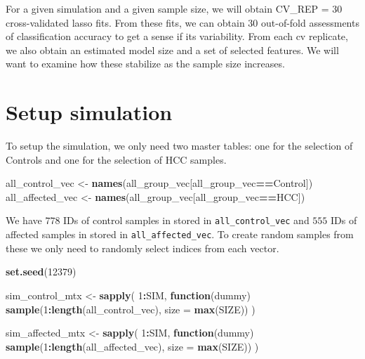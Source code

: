 \documentclass[
]{book}
\newenvironment{Shaded}{\begin{snugshade}}{\end{snugshade}}
\newcommand{\ControlFlowTok}[1]{\textcolor[rgb]{0.13,0.29,0.53}{\textbf{#1}}}
\newcommand{\DataTypeTok}[1]{\textcolor[rgb]{0.13,0.29,0.53}{#1}}
\newcommand{\DecValTok}[1]{\textcolor[rgb]{0.00,0.00,0.81}{#1}}
\newcommand{\KeywordTok}[1]{\textcolor[rgb]{0.13,0.29,0.53}{\textbf{#1}}}
\newcommand{\NormalTok}[1]{#1}
\newcommand{\OperatorTok}[1]{\textcolor[rgb]{0.81,0.36,0.00}{\textbf{#1}}}
\newcommand{\StringTok}[1]{\textcolor[rgb]{0.31,0.60,0.02}{#1}}
\begin{document}
For a given simulation and a given sample size, we will obtain
CV\_REP = \(30\) cross-validated lasso fits. From these fits,
we can obtain \(30\) out-of-fold assessments of classification accuracy
to get a sense if its variability. From each cv replicate, we also obtain
an estimated model size and a set of selected features. We will want
to examine how these stabilize as the sample size increases.

\hypertarget{setup-simulation}{%
\section{Setup simulation}\label{setup-simulation}}

To setup the simulation, we only need two master tables: one for the selection of Controls
and one for the selection of HCC samples.

\begin{Shaded}
\begin{Highlighting}[]
\NormalTok{all\_control\_vec <{-}}\StringTok{ }\KeywordTok{names}\NormalTok{(all\_group\_vec[all\_group\_vec}\OperatorTok{==}\StringTok{\textquotesingle{}Control\textquotesingle{}}\NormalTok{]) }
\NormalTok{all\_affected\_vec <{-}}\StringTok{ }\KeywordTok{names}\NormalTok{(all\_group\_vec[all\_group\_vec}\OperatorTok{==}\StringTok{\textquotesingle{}HCC\textquotesingle{}}\NormalTok{])  }
\end{Highlighting}
\end{Shaded}

We have \(778\) IDs of control samples in stored in \texttt{all\_control\_vec}
and \(555\) IDs of affected samples in stored in \texttt{all\_affected\_vec}.
To create random samples from these we only need to randomly select indices from
each vector.

\begin{Shaded}
\begin{Highlighting}[]
\KeywordTok{set.seed}\NormalTok{(}\DecValTok{12379}\NormalTok{)}

\NormalTok{sim\_control\_mtx <{-}}\StringTok{ }\KeywordTok{sapply}\NormalTok{(}
 \DecValTok{1}\OperatorTok{:}\NormalTok{SIM, }
 \ControlFlowTok{function}\NormalTok{(dummy) }
   \KeywordTok{sample}\NormalTok{(}\DecValTok{1}\OperatorTok{:}\KeywordTok{length}\NormalTok{(all\_control\_vec), }\DataTypeTok{size =}  \KeywordTok{max}\NormalTok{(SIZE))}
\NormalTok{)}


\NormalTok{sim\_affected\_mtx <{-}}\StringTok{ }\KeywordTok{sapply}\NormalTok{(}
 \DecValTok{1}\OperatorTok{:}\NormalTok{SIM, }
 \ControlFlowTok{function}\NormalTok{(dummy) }
   \KeywordTok{sample}\NormalTok{(}\DecValTok{1}\OperatorTok{:}\KeywordTok{length}\NormalTok{(all\_affected\_vec), }\DataTypeTok{size =}  \KeywordTok{max}\NormalTok{(SIZE))}
\NormalTok{)}
\end{Highlighting}
\end{Shaded}
\end{document}
